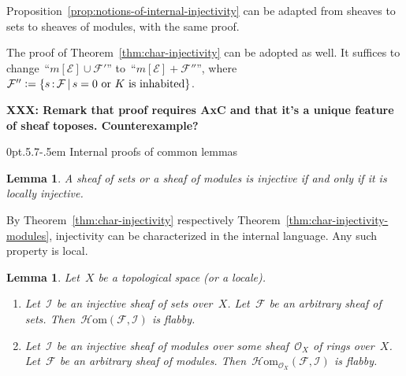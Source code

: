 \documentclass[10pt,reqno,a4paper]{amsbook}
\makeatletter
\theoremstyle{definition}
\theoremstyle{plain}
\newtheorem{lemma}[defn]{Lemma}
\theoremstyle{remark}
\newcommand{\E}{\mathcal{E}}
\newcommand{\F}{\mathcal{F}}
\renewcommand{\O}{\mathcal{O}}
\newcommand{\I}{\mathcal{I}}
\newcommand{\HOM}{\mathcal{H}\mathrm{om}}
\newcommand{\?}{\,{:}\,}
\renewcommand{\_}{\mathpunct{.}\,}
\newcommand{\XXX}[1]{\textbf{XXX: #1}}
\newcommand{\XXXh}[1]{}
\newcommand{\defeq}{\vcentcolon=}
\renewenvironment{proof}[1][\proofname]{\par
  \pushQED{\qed}%
  \normalfont \topsep6\p@\@plus6\p@\relax
  \trivlist
  \item[\hskip\labelsep
        \itshape
    #1\@addpunct{.}]\ignorespaces
}{%
  \popQED\endtrivlist\@endpefalse
}
\def\subsection{\@startsection{subsection}{2}%
  {0pt}{.5\linespacing\@plus.7\linespacing}{-.5em}%
  {\normalfont\bfseries}}
\makeatother
\begin{document}
\begin{proof}Proposition~\ref{prop:notions-of-internal-injectivity} can be
adapted from sheaves to sets to sheaves of modules, with the same proof.
\XXXh{check that.}

The proof of Theorem~\ref{thm:char-injectivity} can be adopted as well.
It suffices to change~``$m[\E] \cup \F'$'' to~``$m[\E] + \F''$'', where~$\F''
\defeq \{ s \? \F \,|\, \text{$s = 0$ or $K$ is inhabited} \}$.
\end{proof}

\XXX{Remark that proof requires AxC and that it's a unique feature of sheaf toposes.
Counterexample?}


\subsection{Internal proofs of common lemmas}

\begin{lemma}A sheaf of sets or a sheaf of modules is injective if and only if it
is locally injective.\end{lemma}

\begin{proof}By Theorem~\ref{thm:char-injectivity} respectively
Theorem~\ref{thm:char-injectivity-modules}, injectivity can be characterized in the
internal language. Any such property is local.\end{proof}

\begin{lemma}Let~$X$ be a topological space (or a locale).
\begin{enumerate}
\item Let~$\I$ be an injective sheaf of sets over~$X$. Let~$\F$ be an arbitrary
sheaf of sets. Then~$\HOM(\F,\I)$ is flabby.
\item Let~$\I$ be an injective sheaf of modules over some sheaf~$\O_X$ of rings
over~$X$. Let~$\F$ be an arbitrary sheaf of modules.
Then~$\HOM_{\O_X}(\F,\I)$ is flabby.
\end{enumerate}
\end{lemma}
\end{document}
